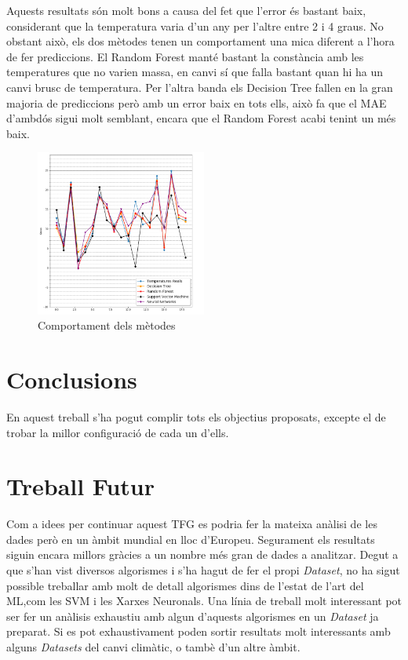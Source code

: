 \documentclass[10pt,a4paper,twocolumn,twoside]{article}
\begin{document}
Aquests resultats són molt bons a causa del fet que l'error és bastant baix, considerant que la temperatura varia d'un any per l'altre entre 2 i 4 graus. No obstant això, els dos mètodes tenen un comportament una mica diferent a l'hora de fer prediccions. El Random Forest manté bastant la constància amb les temperatures que no varien massa, en canvi sí que falla bastant quan hi ha un canvi brusc de temperatura. Per l'altra banda els Decision Tree fallen en la gran majoria de prediccions però amb un error baix en tots ells, això fa que el MAE d'ambdós sigui molt semblant, encara que el Random Forest acabi tenint un més baix.
\begin{figure}[!h]
\centering
	\includegraphics[width=0.5\textwidth]{../img/comparacioAlgs}
	\caption{Comportament dels mètodes}
	\label{fig-temps}
\end{figure}

\section {Conclusions}
En aquest treball s'ha pogut complir tots els objectius proposats, excepte el de trobar la millor configuració de cada un d'ells. 
\section{Treball Futur}
Com a idees per continuar aquest TFG es podria fer la mateixa anàlisi de les dades però en un àmbit mundial en lloc d'Europeu. Segurament els resultats siguin encara millors gràcies a un nombre més gran de dades a analitzar. Degut a que s'han vist diversos algorismes i s'ha hagut de fer el propi \textit{Dataset}, no ha sigut possible treballar amb molt de detall algorismes dins de l'estat de l'art del ML,com les SVM i les Xarxes Neuronals. Una línia de treball molt interessant pot ser fer un anàlisis exhaustiu amb algun d'aquests algorismes en un \textit{Dataset} ja preparat. Si es pot exhaustivament poden sortir resultats molt interessants amb alguns \textit{Datasets} del canvi climàtic, o tambè d'un altre àmbit.
\end{document}
